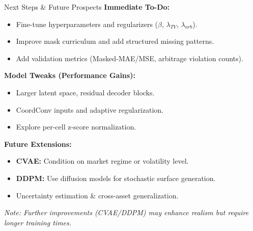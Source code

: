 \documentclass[11pt,aspectratio=169]{beamer}
\begin{document}
\begin{frame}{Next Steps \& Future Prospects}
    \small
    \textbf{Immediate To-Do:}
    \begin{itemize}
        \item Fine-tune hyperparameters and regularizers ($\beta$, $\lambda_{TV}$,
              $\lambda_{arb}$).
        \item Improve mask curriculum and add structured missing patterns.
        \item Add validation metrics (Masked-MAE/MSE, arbitrage violation counts).
    \end{itemize}

    \vspace{2mm}
    \textbf{Model Tweaks (Performance Gains):}
    \begin{itemize}
        \item Larger latent space, residual decoder blocks.
        \item CoordConv inputs and adaptive regularization.
        \item Explore per-cell z-score normalization.
    \end{itemize}

    \vspace{2mm}
    \textbf{Future Extensions:}
    \begin{itemize}
        \item \textbf{CVAE:} Condition on market regime or volatility level.
        \item \textbf{DDPM:} Use diffusion models for stochastic surface generation.
        \item Uncertainty estimation \& cross-asset generalization.
    \end{itemize}

    \vspace{1mm}
    \textit{\footnotesize Note: Further improvements (CVAE/DDPM) may enhance realism but require longer training times.}
    \normalsize
\end{frame}

\end{document}
